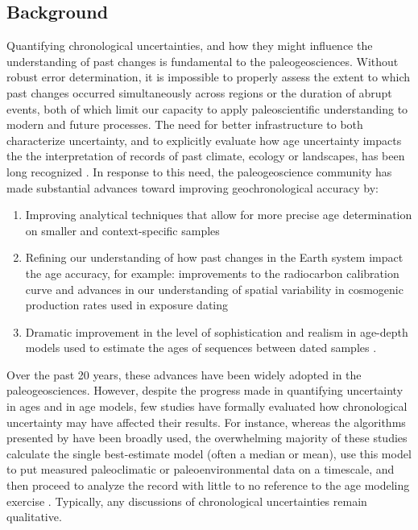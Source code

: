\documentclass[gc, manuscript]{copernicus}
\begin{document}


\introduction

\subsection{Background}

Quantifying chronological uncertainties, and how they might influence the understanding of past changes is fundamental to the paleogeosciences.
Without robust error determination, it is impossible to properly assess the extent to which past changes occurred simultaneously across regions or the duration of abrupt events, both of which limit our capacity to apply paleoscientific understanding to modern and future processes.
The need for better infrastructure to both characterize uncertainty, and to explicitly evaluate how age uncertainty impacts the the interpretation of records of past climate, ecology or landscapes, has been long recognized \citep[(more)]{Noren2013}.
In response to this need, the paleogeoscience community has made substantial advances toward improving geochronological accuracy by:

\begin{enumerate}
\def\labelenumi{\arabic{enumi}.}
\item
  Improving analytical techniques that allow for more precise age determination on smaller and context-specific samples \citep[\citet{Eglinton96},\citet{Fifield2000},\citet{Eggins2005},\citet{Santos_blank_2010}]{Brown_radiocarbon89}
\item
  Refining our understanding of how past changes in the Earth system impact the age accuracy, for example: improvements to the radiocarbon calibration curve \citep[\citet{Stuiver98},intcal references]{Stuiver91} and advances in our understanding of spatial variability in cosmogenic production rates used in exposure dating \citep[\citet{Masarik2009}]{Balco2009}
\item
  Dramatic improvement in the level of sophistication and realism in age-depth models used to estimate the ages of sequences between dated samples \citep[e.g.][\citet{parnell2008flexible}, \citet{Blaauw2010CLAM}, \citet{Blaauw2011BACON}]{Ramsey2009Bayesian}.
\end{enumerate}

Over the past 20 years, these advances have been widely adopted in the paleogeosciences.
However, despite the progress made in quantifying uncertainty in ages and in age models, few studies have formally evaluated how chronological uncertainty may have affected their results.
For instance, whereas the algorithms presented by \citep[\citet{parnell2008flexible}, \citet{Blaauw2010CLAM}, \citet{Blaauw2011BACON}]{Ramsey2009Bayesian} have been broadly used, the overwhelming majority of these studies calculate the single best-estimate model (often a median or mean), use this model to put measured paleoclimatic or paleoenvironmental data on a timescale, and then proceed to analyze the record with little to no reference to the age modeling exercise \citep[\citet{McKay2009}]{McKay2008}.
Typically, any discussions of chronological uncertainties remain qualitative.
\end{document}
